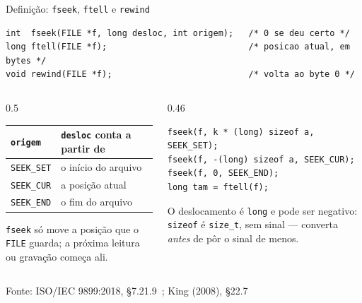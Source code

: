 \documentclass[aspectratio=169]{beamer}
\newcommand{\fonte}[1]{\vfill\hfill{\scriptsize\textcolor{UFSGray}{Fonte: #1}}}
\begin{document}
\begin{frame}[fragile]{Definição: \texttt{fseek}, \texttt{ftell} e \texttt{rewind}}
  \vspace{-0.3em}
\begin{lstlisting}[style=codC]
int  fseek(FILE *f, long desloc, int origem);   /* 0 se deu certo */
long ftell(FILE *f);                            /* posicao atual, em bytes */
void rewind(FILE *f);                           /* volta ao byte 0 */
\end{lstlisting}
  \begin{columns}[T]
    \begin{column}{0.5\textwidth}
      \begin{center}
      \small
      \begin{tabular}{@{}ll@{}}
        \toprule
        \texttt{origem} & \texttt{desloc} conta a partir de\\
        \midrule
        \texttt{SEEK\_SET} & o início do arquivo\\
        \texttt{SEEK\_CUR} & a posição atual\\
        \texttt{SEEK\_END} & o fim do arquivo\\
        \bottomrule
      \end{tabular}
      \end{center}
      \small \texttt{fseek} só move a posição que o \texttt{FILE} guarda; a
      próxima leitura ou gravação começa ali.
    \end{column}
    \begin{column}{0.46\textwidth}
\begin{lstlisting}[style=codCs]
fseek(f, k * (long) sizeof a, SEEK_SET);
fseek(f, -(long) sizeof a, SEEK_CUR);
fseek(f, 0, SEEK_END);
long tam = ftell(f);
\end{lstlisting}
      \small O deslocamento é \texttt{long} e pode ser negativo:
      \texttt{sizeof} é \texttt{size\_t}, sem sinal --- converta
      \emph{antes} de pôr o sinal de menos.
    \end{column}
  \end{columns}
  \fonte{ISO/IEC 9899:2018, §7.21.9~\cite{iso2018c17};
    King (2008), §22.7~\cite{king2008c}}
\end{frame}
\end{document}
